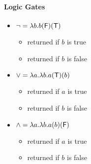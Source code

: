 \documentclass[11pt,openany]{article}
\begin{document}
\paragraph*{Logic Gates}
\begin{itemize}
	\item $\lnot = \lambda b. b(\textsf{F})(\mathsf{T})$
	\begin{itemize}
		\item returned if $b$ is true
		\item returned if $b$ is false
	\end{itemize}
	\item $\lor = \lambda a.\lambda b. a(\mathsf{T})(b)$
	\begin{itemize}
	\item returned if $a$ is true
	\item returned if $b$ is false
	\end{itemize}
	\item $\land = \lambda a. \lambda b. a(b)(\textsf{F})$
	\begin{itemize}
	\item returned if $a$ is true
	\item returned if $b$ is false
	\end{itemize}
\end{itemize}

\end{document}
